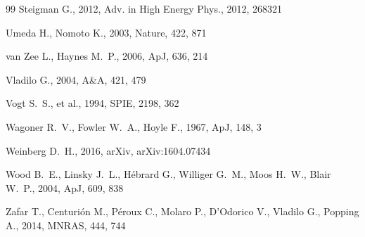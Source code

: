 \documentclass[12pt,preprint,useAMS,usenatbib]{emulateapj}
\begin{document}
\begin{thebibliography}{99}
Steigman G., 2012, Adv. in High Energy Phys., 2012, 268321

Umeda H., Nomoto K., 2003, Nature, 422, 871

van Zee L., Haynes M.~P., 2006, ApJ, 636, 214

Vladilo G., 2004, A\&A, 421, 479

Vogt S.~S., et al., 1994, SPIE, 2198, 362

Wagoner R.~V., Fowler W.~A., Hoyle F., 1967, ApJ, 148, 3

Weinberg D.~H., 2016, arXiv, arXiv:1604.07434

Wood B.~E., Linsky J.~L., H{\'e}brard G., Williger G.~M., Moos H.~W., Blair W.~P., 2004, ApJ, 609, 838

Zafar T., Centuri{\'o}n M., P{\'e}roux C., Molaro P., D'Odorico V., Vladilo G., Popping A., 2014, MNRAS, 444, 744

\end{thebibliography}

\end{document}
